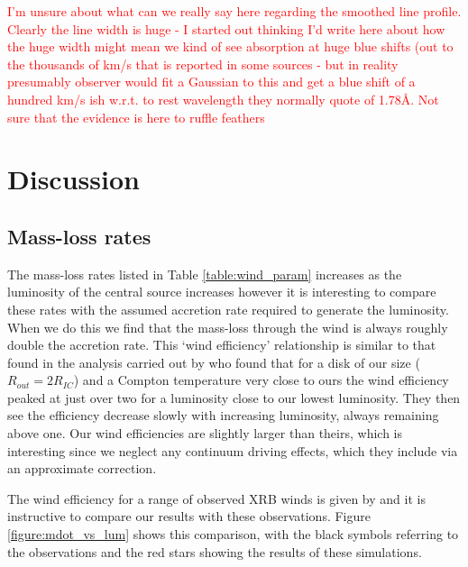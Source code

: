 \documentclass[a4paper,fleqn,usenatbib]{mnras}
\begin{document}
\textcolor{red}{I'm unsure about what can we really say
here regarding the smoothed line profile. Clearly the line width is huge - I started out thinking I'd 
write here about how the 
huge width might mean we kind of see absorption at huge blue shifts (out to the thousands of km/s 
that is reported in some sources - but in reality presumably
observer would fit a Gaussian to this and get a blue shift of a hundred km/s ish w.r.t. to rest
wavelength they normally quote of 1.78\AA. Not sure that the evidence is here to ruffle feathers}






\section{Discussion}
\label{section:discussion}


\subsection{Mass-loss rates}

The mass-loss rates listed in Table \ref{table:wind_param} 
increases as the luminosity of the central source increases however it is interesting to compare
these rates with the assumed accretion rate required to generate the luminosity. When we do 
this we find that the mass-loss through the wind is always roughly double the accretion rate.
This `wind efficiency' relationship is similar to that found in the analysis carried out by \cite{2018MNRAS.473..838D}
who found that for a disk of our size ($R_{out}=2R_{IC}$) and a Compton temperature
very close to ours the wind efficiency peaked at just over two for a luminosity close to our lowest luminosity.
They then see the efficiency decrease slowly with increasing luminosity, 
always remaining above one. Our wind efficiencies are slightly larger than theirs, which is interesting since
we neglect any continuum driving effects, which they include via an approximate correction. 

The wind efficiency for a range of observed XRB winds is given by \cite{2012MNRAS.422L..11P} and
it is instructive to compare our results with these observations. Figure \ref{figure:mdot_vs_lum} shows 
this comparison, with the black symbols referring to the observations and the red stars showing the
results of these simulations. 
\end{document}
